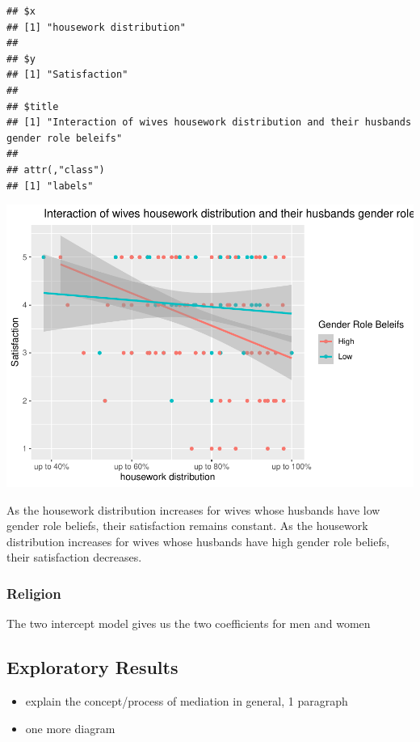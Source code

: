 \documentclass[
  man,floatsintext]{apa6}
\providecommand{\tightlist}{%
  \setlength{\itemsep}{0pt}\setlength{\parskip}{0pt}}
\begin{document}
\begin{verbatim}
## $x
## [1] "housework distribution"
## 
## $y
## [1] "Satisfaction"
## 
## $title
## [1] "Interaction of wives housework distribution and their husbands gender role beleifs"
## 
## attr(,"class")
## [1] "labels"
\end{verbatim}

\includegraphics{results_files/figure-latex/unnamed-chunk-10-1.pdf}

As the housework distribution increases for wives whose husbands have low gender role beliefs, their satisfaction remains constant. As the housework distribution increases for wives whose husbands have high gender role beliefs, their satisfaction decreases.

\hypertarget{religion}{%
\subsubsection{Religion}\label{religion}}

The two intercept model gives us the two coefficients for men and women

\hypertarget{exploratory-results}{%
\subsection{Exploratory Results}\label{exploratory-results}}

\begin{itemize}
\tightlist
\item
  explain the concept/process of mediation in general, 1 paragraph
\item
  one more diagram
\end{itemize}
\end{document}
